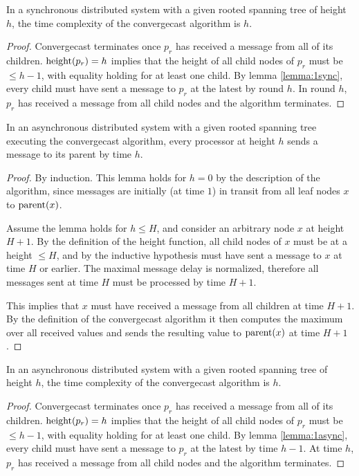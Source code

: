 \begin{theorem}
In a synchronous distributed system with a given rooted spanning tree of height $h$, the time
complexity of the convergecast algorithm is $h$.
\end{theorem}

\begin{proof}
Convergecast terminates once $p_r$ has received a message from all of its children.
$\text{height}(p_r) = h$ implies that the height of all child nodes of $p_r$ must be
$\leq h - 1$, with equality holding for at least one child. By lemma \ref{lemma:1sync},
every child must have sent a message to $p_r$ at the latest by round $h$. In round
$h$, $p_r$ has received a message from all child nodes and the algorithm terminates.
\end{proof}

\begin{lemma} \label{lemma:1async}
In an asynchronous distributed system with a given rooted spanning tree executing the convergecast
algorithm, every processor at height $h$ sends a message to its parent by time $h$.
\end{lemma}

\begin{proof}
By induction. This lemma holds for $h = 0$ by the description of the algorithm, since
messages are initially (at time $1$) in transit from all leaf nodes $x$ to $\text{parent}(x)$.

Assume the lemma holds for $h \leq H$, and consider an arbitrary node $x$ at height
$H + 1$. By the definition of the height function, all child nodes of $x$ must be at
a height $\leq H$, and by the inductive hypothesis must have sent a message to
$x$ at time $H$ or earlier.
The maximal message delay is normalized, therefore all messages sent at time $H$
must be processed by time $H + 1$.

This implies that $x$ must have received
a message from all children at time $H + 1$. By the definition of the
convergecast algorithm it then computes the maximum over all received values and
sends the resulting value to $\text{parent}(x)$ at time $H + 1$.
\end{proof}

\begin{theorem}
In an asynchronous distributed system with a given rooted spanning tree of height $h$, the time
complexity of the convergecast algorithm is $h$.
\end{theorem}

\begin{proof}
Convergecast terminates once $p_r$ has received a message from all of its children.
$\text{height}(p_r) = h$ implies that the height of all child nodes of $p_r$ must be
$\leq h - 1$, with equality holding for at least one child. By lemma \ref{lemma:1async},
every child must have sent a message to $p_r$ at the latest by time $h - 1$. At time
$h$, $p_r$ has received a message from all child nodes and the algorithm terminates.
\end{proof}

